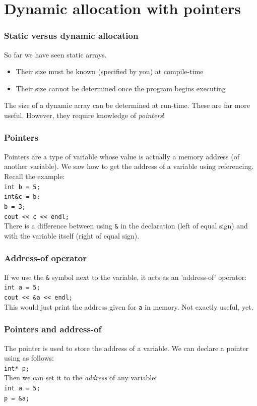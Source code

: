 \documentclass{if-beamer}
\begin{document}
\section{Dynamic allocation with pointers}

\begin{frame}
\frametitle{Static versus dynamic allocation}
So far we have seen static arrays.
\begin{itemize}
\item Their size must be known (specified by you) at compile-time
\item Their size cannot be determined once the program begins executing
\end{itemize}

The size of a dynamic array can be determined at run-time. These are
far more useful. However, they require knowledge of \textit{pointers}!
\end{frame}

\begin{frame}
\frametitle{Pointers}
Pointers are a type of variable whose value is actually a memory
address (of another variable). We saw how to get the address of a
variable using referencing. Recall the example: \\
\vspace{5pt}
\texttt{int b = 5;} \\
\texttt{int\&c = b;} \\
\texttt{b = 3;} \\
\texttt{cout << c << endl;} \\
\vspace{5pt}
There is a difference between using \texttt{\&} in the declaration
(left of equal sign) and with the variable itself (right of equal sign).
\end{frame}

\begin{frame}
\frametitle{Address-of operator}
If we use the \texttt{\&} symbol next to the variable, it acts as an
'address-of' operator: \\
\vspace{5pt}
\texttt{int a = 5;} \\
\texttt{cout << \&a << endl;} \\
\vspace{5pt}
This would just print the address given for \texttt{a} in memory. Not exactly useful, yet.
\end{frame}

\begin{frame}
\frametitle{Pointers and address-of}
The pointer is used to store the address of a variable. We can declare
a pointer using \texttt{\textasteriskcentered} as follows: \\
\vspace{5pt}
\texttt{int* p;} \\
\vspace{5pt}
Then we can set it to the \textit{address} of any variable:\\
\vspace{5pt}
\texttt{int a = 5;}\\
\texttt{p = \&a;}\\
\end{frame}
\end{document}
